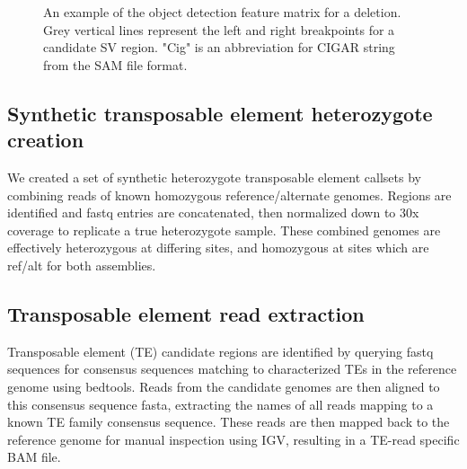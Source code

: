 \begin{figure}
    \centering
    \caption[Sample representations of the object detection feature matrix.]{An example of the object detection feature matrix for a deletion. Grey vertical lines represent the left and right breakpoints for a candidate SV region. "Cig" is an abbreviation for CIGAR string from the SAM file format.}
    \label{fig:example_pileup}
\end{figure}

\subsection{Synthetic transposable element heterozygote creation}
We created a set of synthetic heterozygote transposable element callsets by combining reads of known homozygous reference/alternate genomes. Regions are identified and fastq entries are concatenated, then normalized down to 30x coverage to replicate a true heterozygote sample. These combined genomes are effectively heterozygous at differing sites, and homozygous at sites which are ref/alt for both assemblies.

\subsection{Transposable element read extraction}

Transposable element (TE) candidate regions are identified by querying fastq sequences for consensus sequences matching to characterized TEs in the reference genome using bedtools. Reads from the candidate genomes are then aligned to this consensus sequence fasta, extracting the names of all reads mapping to a known TE family consensus sequence. These reads are then mapped back to the reference genome for manual inspection using IGV, resulting in a TE-read specific BAM file. 

